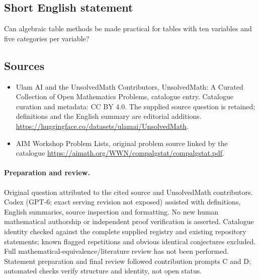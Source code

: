\documentclass[11pt]{article}
\begin{document}
\subsection{Short English statement}
Can algebraic table methods be made practical for tables with ten variables and five categories per variable?
\subsection{Sources}
\begin{itemize}
\item[\hypertarget{source:statement:1}{S1}] Ulam AI and the UnsolvedMath Contributors, UnsolvedMath: A Curated Collection of Open Mathematics Problems, catalogue entry. Catalogue curation and metadata: CC BY 4.0. The supplied source question is retained; definitions and the English summary are editorial additions.
\url{https://huggingface.co/datasets/ulamai/UnsolvedMath}.
\item[\hypertarget{source:statement:2}{S2}] AIM Workshop Problem Lists, original problem source linked by the catalogue
\url{https://aimath.org/WWN/compalgstat/compalgstat.pdf}.
\end{itemize}
\paragraph{Preparation and review.}
Original question attributed to the cited source and UnsolvedMath contributors. Codex (GPT-6; exact serving revision not exposed) assisted with definitions, English summaries, source inspection and formatting. No new human mathematical authorship or independent proof verification is asserted. Catalogue identity checked against the complete supplied registry and existing repository statements; known flagged repetitions and obvious identical conjectures excluded. Full mathematical-equivalence/literature review has not been performed. Statement preparation and final review followed contribution prompts C and D; automated checks verify structure and identity, not open status.
\label{end:statement}
\end{document}
